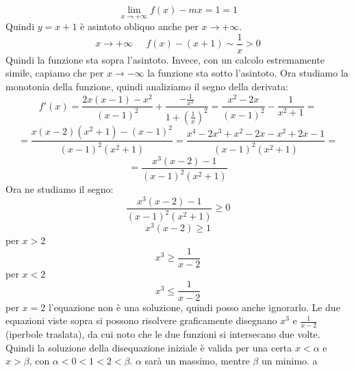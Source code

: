 \[
    \lim_{x\rightarrow  +\infty} f(x) - mx = 1 = 1
\]
Quindi $y=x+1$ è asintoto obliquo anche per $x \rightarrow +\infty$.
\[
    x \rightarrow + \infty \;\;\;\;\; f(x) -(x+1) \sim \frac{1}{x} > 0
\]
Quindi la funzione sta sopra l'asintoto.\newline
Invece, con un calcolo estremamente simile, capiamo che per $x \rightarrow  -\infty$ la funzione sta sotto l'asintoto.\newline
Ora studiamo la monotonia della funzione, quindi analiziamo il segno della derivata:
\[
    f'(x) = \frac{2x(x-1)-x^2}{(x-1)^2} + \frac{-\frac{1}{x^2}}{1+(\frac{1}{x})^2} = \frac{x^2-2x}{(x-1)^2}- \frac{1}{x^2+1} =
\]
\[
    = \frac{x(x-2)(x^2+1)-(x-1)^2}{(x-1)^2(x^2+1)} = \frac{x^4-2x^3+x^2-2x-x^2+2x-1}{(x-1)^2(x^2+1)} =
\]
\[
    = \frac{x^3(x-2)-1}{(x-1)^2(x^2+1)}
\]
Ora ne studiamo il segno:
\[
    \frac{x^3(x-2)-1}{(x-1)^2(x^2+1)} \geq 0
\]
\[
    x^3(x-2) \geq 1
\]
per $x > 2$
\[
    x^3 \geq \frac{1}{x-2}
\]
per $x < 2$
\[
    x^3 \leq \frac{1}{x-2}
\]
per $x=2$ l'equazione non è una soluzione, quindi posso anche ignorarlo. Le due equazioni viste sopra si possono risolvere graficamente disegnano $x^3$ e $\frac{1}{x-2}$ (iperbole traslata), da cui noto che le due funzioni si intersecano due volte. Quindi la soluzione della disequazione iniziale è valida per una certa $x< \alpha$ e $x>\beta$, con $\alpha<0<1<2<\beta$. $\alpha$ sarà un massimo, mentre $\beta$ un minimo.\newline
\newpage
a
\newpage
